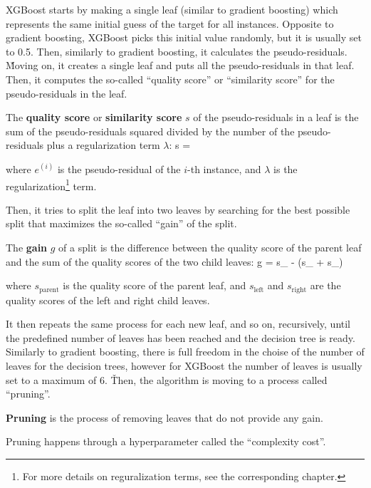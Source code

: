 XGBoost starts by making a single leaf (similar to gradient boosting) which represents the same initial guess of the
target for all instances. Opposite to gradient boosting, XGBoost picks this initial value randomly, but it is usually
set to 0.5. Then, similarly to gradient boosting, it calculates the pseudo-residuals. \v

Moving on, it creates a single leaf and puts all the pseudo-residuals in that leaf. Then, it computes the so-called
``quality score'' or ``similarity score'' for the pseudo-residuals in the leaf.

The \textbf{quality score} or \textbf{similarity score} $s$ of the pseudo-residuals in a leaf is the sum of the
pseudo-residuals squared divided by the number of the pseudo-residuals plus a regularization term $\lambda$:
\bse
s = 
\ese

where $e^{(i)}$ is the pseudo-residual of the $i$-th instance, and $\lambda$ is the regularization\footnote{For
more details on reguralization terms, see the corresponding chapter.} term.
\ed

Then, it tries to split the leaf into two leaves by searching for the best possible split that maximizes
the so-called ``gain'' of the split.

\bd[Gain]
The \textbf{gain} $g$ of a split is the difference between the quality score of the parent leaf and the sum of the
quality scores of the two child leaves:
\bse
g = s_{} - (s_{} + s_{})
\ese

where $s_{\text{parent}}$ is the quality score of the parent leaf, and $s_{\text{left}}$ and $s_{\text{right}}$ are
the quality scores of the left and right child leaves.
\ed

It then repeats the same process for each new leaf, and so on, recursively, until the predefined number of
leaves has been reached and the decision tree is ready. Similarly to gradient boosting, there is full freedom in the
choise of the number of leaves for the decision trees, however for XGBoost the number of leaves is usually set to a
maximum of 6. \v

Then, the algorithm is moving to a process called ``pruning''.

\bd[Pruning]
\textbf{Pruning} is the process of removing leaves that do not provide any gain.
\ed

Pruning happens through a hyperparameter called the ``complexity cost''.

